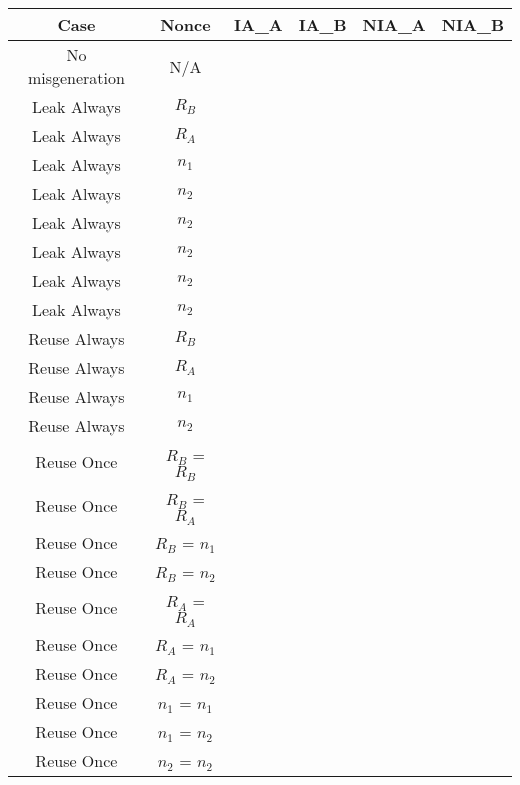 \documentclass[crop]{standalone}
\newcommand{\noattack}{\color{ForestGreen}\usym{2713}\color{black}}
\newcommand{\attack}{\color{red}\usym{2717}\color{black}}
\begin{document}
\parbox{30cm}{
\begin{tabular}{|c|c|c|c|c|c|}
\hline
Case & Nonce & IA\_A & IA\_B & NIA\_A & NIA\_B \\ \hline
No misgeneration & N/A & \noattack & \noattack & \noattack & \noattack\\ \hline
Leak Always & $R_B$ & \noattack & \noattack & \noattack & \noattack\\ \hline
Leak Always & $R_A$ & \noattack & \noattack & \noattack & \noattack\\ \hline
Leak Always & $n_1$ & \noattack & \noattack & \noattack & \noattack\\ \hline
Leak Always & $n_2$ & \noattack & \noattack & \noattack & \noattack\\ \hline
Leak Always & $n_2$ & \noattack & \noattack & \noattack & \noattack\\ \hline
Leak Always & $n_2$ & \noattack & \noattack & \noattack & \noattack\\ \hline
Leak Always & $n_2$ & \noattack & \noattack & \noattack & \noattack\\ \hline
Leak Always & $n_2$ & \noattack & \noattack & \noattack & \noattack\\ \hline
Reuse Always & $R_B$ & \noattack & \attack & \noattack & \noattack\\ \hline
Reuse Always & $R_A$ & \attack & \noattack & \attack & \noattack\\ \hline
Reuse Always & $n_1$ & \attack & \attack & \attack & \attack\\ \hline
Reuse Always & $n_2$ & \attack & \attack & \attack & \attack\\ \hline
Reuse Once & $R_B$ = $R_B$ & \noattack & \attack & \noattack & \noattack\\ \hline
Reuse Once & $R_B$ = $R_A$ & \noattack & \noattack & \noattack & \noattack\\ \hline
Reuse Once & $R_B$ = $n_1$ & \noattack & \noattack & \noattack & \noattack\\ \hline
Reuse Once & $R_B$ = $n_2$ & \noattack & \noattack & \noattack & \noattack\\ \hline
Reuse Once & $R_A$ = $R_A$ & \attack & \noattack & \attack & \noattack\\ \hline
Reuse Once & $R_A$ = $n_1$ & \noattack & \noattack & \noattack & \noattack\\ \hline
Reuse Once & $R_A$ = $n_2$ & \noattack & \noattack & \noattack & \noattack\\ \hline
Reuse Once & $n_1$ = $n_1$ & \attack & \attack & \attack & \attack\\ \hline
Reuse Once & $n_1$ = $n_2$ & \attack & \attack & \attack & \attack\\ \hline
Reuse Once & $n_2$ = $n_2$ & \attack & \attack & \attack & \attack\\ \hline
\end{tabular}}
\end{document}
